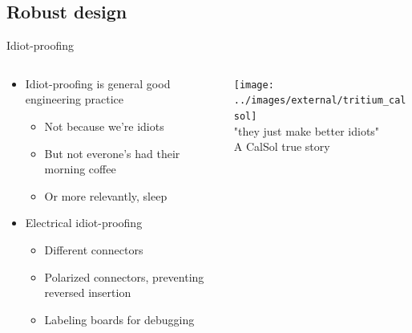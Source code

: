 \documentclass{beamer}
\begin{document}
\subsection{Robust design}
\begin{frame}{Idiot-proofing}
  \begin{columns}[T]
    \begin{column}{.6\textwidth}
      \begin{itemize}
        \item Idiot-proofing is general good engineering practice
        \begin{itemize}
          \item Not because we're idiots
          \item But not everone's had their morning coffee
          \item Or more relevantly, sleep
        \end{itemize}
        \item Electrical idiot-proofing
        \begin{itemize}
          \item Different connectors
          \item Polarized connectors, preventing reversed insertion
          \item Labeling boards for debugging
        \end{itemize}
      \end{itemize}
    \end{column}

    \begin{column}{0.4\textwidth} \centering
      \texttt{[image: ../images/external/tritium\_calsol]} \\
      "they just make better idiots" \\
      {\tiny A CalSol true story}
    \end{column}
  \end{columns}
\end{frame}
\end{document}
